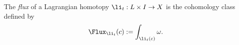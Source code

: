 

    The \emph{flux} of a Lagrangian homotopy $\li_t:L\times I\to X$ is the cohomology class defined by
    \[\Flux_{\li_t}(c):=\int_{\li_t(c)}\omega.\]

